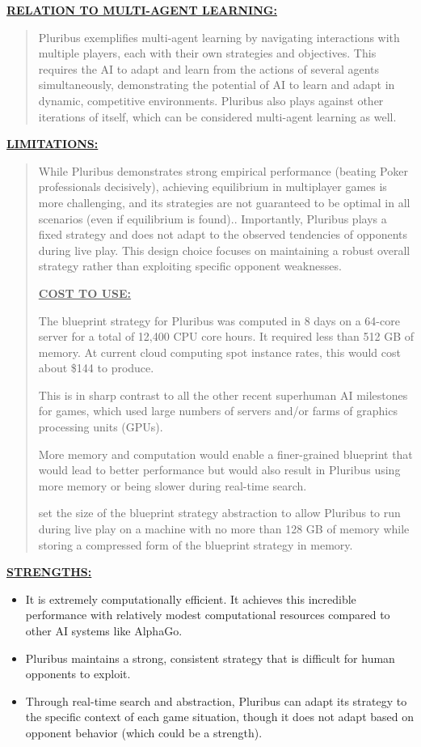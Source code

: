 \documentclass[
]{article}
\begin{document}
\textbf{\ul{RELATION TO MULTI-AGENT LEARNING:}}

\begin{quote}
Pluribus exemplifies multi-agent learning by navigating interactions
with multiple players, each with their own strategies and objectives.
This requires the AI to adapt and learn from the actions of several
agents simultaneously, demonstrating the potential of AI to learn and
adapt in dynamic, competitive environments. Pluribus also plays against
other iterations of itself, which can be considered multi-agent learning
as well.
\end{quote}

\textbf{\ul{LIMITATIONS:}}

\begin{quote}
While Pluribus demonstrates strong empirical performance (beating Poker
professionals decisively), achieving equilibrium in multiplayer games is
more challenging, and its strategies are not guaranteed to be optimal in
all scenarios (even if equilibrium is found).. Importantly, Pluribus
plays a fixed strategy and does not adapt to the observed tendencies of
opponents during live play. This design choice focuses on maintaining a
robust overall strategy rather than exploiting specific opponent
weaknesses.

\textbf{\ul{COST TO USE:}}

The blueprint strategy for Pluribus was computed in 8 days on a 64-core
server for a total of 12,400 CPU core hours. It required less than 512
GB of memory. At current cloud computing spot instance rates, this would
cost about \$144 to produce.

This is in sharp contrast to all the other recent superhuman AI
milestones for games, which used large numbers of servers and/or farms
of graphics processing units (GPUs).

More memory and computation would enable a finer-grained blueprint that
would lead to better performance but would also result in Pluribus using
more memory or being slower during real-time search.

set the size of the blueprint strategy abstraction to allow Pluribus to
run during live play on a machine with no more than 128 GB of memory
while storing a compressed form of the blueprint strategy in memory.
\end{quote}

\textbf{\ul{STRENGTHS:}}

\begin{itemize}
\item
  It is extremely computationally efficient. It achieves this incredible
  performance with relatively modest computational resources compared to
  other AI systems like AlphaGo.
\item
  Pluribus maintains a strong, consistent strategy that is difficult for
  human opponents to exploit.
\item
  Through real-time search and abstraction, Pluribus can adapt its
  strategy to the specific context of each game situation, though it
  does not adapt based on opponent behavior (which could be a strength).
\end{itemize}
\end{document}
